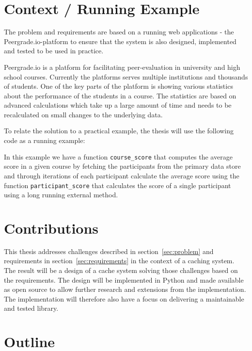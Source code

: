 \section{Context / Running Example}
\label{sec:context}

The problem and requirements are based on a running web applications - the Peergrade.io-platform to ensure that the system is also designed, implemented and tested to be used in practice.

Peergrade.io is a platform for facilitating peer-evaluation in university and high school courses. Currently the platforms serves multiple institutions and thousands of students. One of the key parts of the platform is showing various statistics about the performance of the students in a course. The statistics are based on advanced calculations which take up a large amount of time and needs to be recalculated on small changes to the underlying data.

To relate the solution to a practical example, the thesis will use the following code as a running example:



In this example we have a function \verb$course_score$ that computes the average score in a given course by fetching the participants from the primary data store and through iterations of each participant calculate the average score using the function \verb$participant_score$ that calculates the score of a single participant using a long running external method.


\section{Contributions}
\label{sec:contributions}

This thesis addresses challenges described in section~\ref{sec:problem} and requirements in section~\ref{sec:requirements} in the context of a caching system. The result will be a design of a cache system solving those challenges based on the requirements. The design will be implemented in Python  and made available as open source to allow further research and extensions from the implementation. The implementation will therefore also have a focus on delivering a maintainable and tested library.


\section{Outline}
\label{sec:outline}





